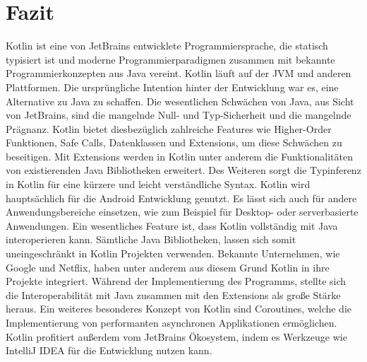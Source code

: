 \documentclass{article}
\begin{document}
\section{Fazit}
Kotlin ist eine von JetBrains entwicklete Programmiersprache, die statisch typisiert ist und moderne Programmierparadigmen zusammen mit bekannte Programmierkonzepten aus Java vereint. Kotlin läuft auf der JVM und anderen Plattformen. Die ursprüngliche Intention hinter der Entwicklung war es, eine Alternative zu Java zu schaffen. Die wesentlichen Schwächen von Java, aus Sicht von JetBrains, sind die mangelnde Null- und Typ-Sicherheit und die mangelnde Prägnanz. Kotlin bietet diesbezüglich zahlreiche Features wie Higher-Order Funktionen, Safe Calls, Datenklassen und Extensions, um diese Schwächen zu beseitigen. Mit Extensions werden in Kotlin unter anderem die Funktionalitäten von existierenden Java Bibliotheken erweitert. Des Weiteren sorgt die Typinferenz in Kotlin für eine kürzere und leicht verständliche Syntax. Kotlin wird hauptsächlich für die Android Entwicklung genutzt. Es lässt sich auch für andere Anwendungsbereiche einsetzen, wie zum Beispiel für Desktop- oder serverbasierte Anwendungen. Ein wesentliches Feature ist, dass Kotlin vollständig mit Java interoperieren kann. Sämtliche Java Bibliotheken, lassen sich somit uneingeschränkt in Kotlin Projekten verwenden. Bekannte Unternehmen, wie Google und Netflix, haben unter anderem aus diesem Grund Kotlin in ihre Projekte integriert. Während der Implementierung des Programms, stellte sich die Interoperabilität mit Java zusammen mit den Extensions als große Stärke heraus.  Ein weiteres besonderes Konzept von Kotlin sind Coroutines, welche die Implementierung von performanten asynchronen Applikationen ermöglichen. Kotlin profitiert außerdem vom JetBrains Ökosystem, indem es Werkzeuge wie IntelliJ IDEA für die Entwicklung nutzen kann.


\end{document}
